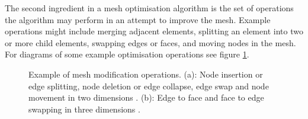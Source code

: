 The second ingredient in a mesh optimisation algorithm is the set of operations the
algorithm may perform in an attempt to improve the mesh. Example operations might include
merging adjacent elements, splitting an element into two or more child elements, swapping
edges or faces, and moving nodes in the mesh. For diagrams of some example optimisation
operations see figure \ref{fig:edge_operations}.

\begin{figure}[h] 
\centering
{} \hspace{7mm}
\caption[Example of mesh modification operations.]{Example of mesh modification operations. (a): Node insertion or edge splitting, node deletion or edge collapse, edge swap and node movement in two dimensions \citep[2D, from][]{piggott2009}. (b): Edge to face and face to edge swapping in three dimensions \citep[3D, from][]{pain2001}.}
\label{fig:edge_operations}
\end{figure}

